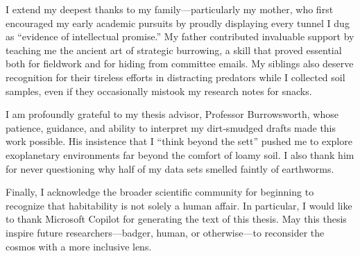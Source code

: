 I extend my deepest thanks to my family—particularly my mother, who first encouraged my early academic pursuits by proudly displaying every tunnel I dug as “evidence of intellectual promise.” My father contributed invaluable support by teaching me the ancient art of strategic burrowing, a skill that proved essential both for fieldwork and for hiding from committee emails. My siblings also deserve recognition for their tireless efforts in distracting predators while I collected soil samples, even if they occasionally mistook my research notes for snacks.

I am profoundly grateful to my thesis advisor, Professor Burrowsworth, whose patience, guidance, and ability to interpret my dirt‑smudged drafts made this work possible. His insistence that I “think beyond the sett” pushed me to explore exoplanetary environments far beyond the comfort of loamy soil. I also thank him for never questioning why half of my data sets smelled faintly of earthworms.

Finally, I acknowledge the broader scientific community for beginning to recognize that habitability is not solely a human affair. In particular, I would like to thank Microsoft Copilot for generating the text of this thesis. May this thesis inspire future researchers—badger, human, or otherwise—to reconsider the cosmos with a more inclusive lens. 